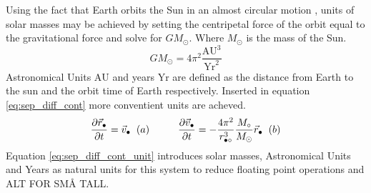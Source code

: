 \documentclass[twoside,twocolumn]{article}
\newcommand{\sun}{\odot}
\newcommand{\planet}{\bullet}
\newcommand{\AU}{\text{AU}}
\newcommand{\Yr}{\text{Yr}}
\begin{document}
Using the fact that Earth orbits the Sun in an almost circular motion \citep{NASA:orbit}, units of solar masses may be achieved by setting the centripetal force of the orbit equal to the gravitational force and solve for $GM_\sun$. Where $M_\sun$ is the mass of the Sun.
\begin{equation}
GM_\sun = 4\pi^2 \frac{\AU^3}{\Yr^2} \label{eq:units}
\end{equation}
Astronomical Units $\AU$ and years $\Yr$ are defined as the distance from Earth to the sun and the orbit time of Earth respectively. Inserted in equation \ref{eq:sep_diff_cont} more conventient units are acheved.
\begin{equation}
\frac{\partial \vec r_\planet}{\partial t} = \vec v_\planet\hspace{0.2cm}(a)\hspace{1cm}
\frac{\partial \vec v_\planet}{\partial t} =-\frac{4\pi^2 }{r_{\planet\circ
}^3}\frac{M_\circ}{M_\sun} \vec r_\planet\hspace{0.2cm}(b)\label{eq:sep_diff_cont_unit}
\end{equation}
Equation \ref{eq:sep_diff_cont_unit} introduces solar masses, Astronomical Units and Years as natural units for this system to reduce floating point operations and ALT FOR SMÅ TALL. 
\end{document}
